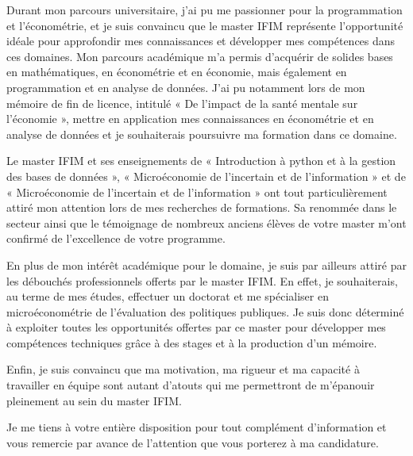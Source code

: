 \documentclass[11pt,a4paper,french]{moderncv}        %
\begin{document}
Durant mon parcours universitaire, j'ai pu me passionner pour la programmation et l’économétrie, et je suis convaincu que le master IFIM représente l'opportunité idéale pour approfondir mes connaissances et développer mes compétences dans ces domaines. Mon parcours académique m’a permis d'acquérir de solides bases en mathématiques, en économétrie et en économie, mais également en programmation et en analyse de données. J'ai pu notamment lors de mon mémoire de fin de licence, intitulé « De l’impact de la santé mentale sur l’économie », mettre en application mes connaissances en économétrie et en analyse de données et je souhaiterais poursuivre ma formation dans ce domaine.

Le master IFIM et ses enseignements de « Introduction à python et à la gestion des bases de données  », « Microéconomie de l’incertain et de l’information  » et de « Microéconomie de l’incertain et de l’information  » ont tout particulièrement attiré mon attention lors de mes recherches de formations. Sa renommée dans le secteur ainsi que le témoignage de nombreux anciens élèves de votre master m'ont confirmé de l'excellence de votre programme.

En plus de mon intérêt académique pour le domaine, je suis par ailleurs attiré par les débouchés professionnels offerts par le master IFIM. En effet, je souhaiterais, au terme de mes études, effectuer un doctorat et me spécialiser en microéconométrie de l’évaluation des politiques publiques. Je suis donc déterminé à exploiter toutes les opportunités offertes par ce master pour développer mes compétences techniques grâce à des stages et à la production d’un mémoire.

Enfin, je suis convaincu que ma motivation, ma rigueur et ma capacité à travailler en équipe sont autant d'atouts qui me permettront de m'épanouir pleinement au sein du master IFIM.

Je me tiens à votre entière disposition pour tout complément d'information et vous remercie par avance de l'attention que vous porterez à ma candidature.














\makeletterclosing
\end{document}
